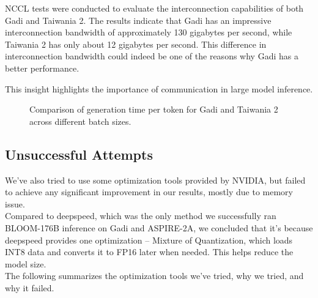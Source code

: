 NCCL tests were conducted to evaluate the interconnection capabilities of both Gadi and Taiwania 2. The results indicate that Gadi has an impressive interconnection bandwidth of approximately 130 gigabytes per second, while Taiwania 2 has only about 12 gigabytes per second. This difference in interconnection bandwidth could indeed be one of the reasons why Gadi has a better performance. 

This insight highlights the importance of communication in large model inference.


\begin{figure}[h!]
\centering
{}
\caption{Comparison of generation time per token for Gadi and Taiwania 2 across different batch sizes.}
\end{figure}


\subsection{Unsuccessful Attempts}
We've also tried to use some optimization tools provided by NVIDIA, but failed to achieve any significant improvement in our results, mostly due to memory issue.\\
Compared to deepspeed, which was the only method we successfully ran BLOOM-176B inference on Gadi and ASPIRE-2A, we concluded that it's because deepspeed provides one optimization -- Mixture of Quantization, which loads INT8 data and converts it to FP16 later when needed. This helps reduce the model size. \\
The following summarizes the optimization tools we've tried, why we tried, and why it failed.
